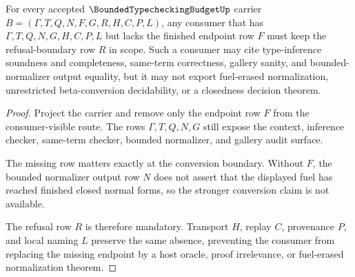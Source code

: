 \begin{theorem}
\label{thm:bounded-typechecking-budget-refusal-boundary}
For every accepted $\BoundedTypecheckingBudgetUp$ carrier $B=(\Gamma,T,Q,N,F,G,R,H,C,P,L)$, any consumer that has $\Gamma,T,Q,N,G,H,C,P,L$ but lacks the finished endpoint row $F$ must keep the refusal-boundary row $R$ in scope. Such a consumer may cite type-inference soundness and completeness, same-term correctness, gallery sanity, and bounded-normalizer output equality, but it may not export fuel-erased normalization, unrestricted beta-conversion decidability, or a closedness decision theorem.
\end{theorem}
\begin{proof}
Project the carrier and remove only the endpoint row $F$ from the consumer-visible route. The rows $\Gamma,T,Q,N,G$ still expose the context, inference checker, same-term checker, bounded normalizer, and gallery audit surface.

The missing row matters exactly at the conversion boundary. Without $F$, the bounded normalizer output row $N$ does not assert that the displayed fuel has reached finished closed normal forms, so the stronger conversion claim is not available.

The refusal row $R$ is therefore mandatory. Transport $H$, replay $C$, provenance $P$, and local naming $L$ preserve the same absence, preventing the consumer from replacing the missing endpoint by a host oracle, proof irrelevance, or fuel-erased normalization theorem.
\end{proof}




